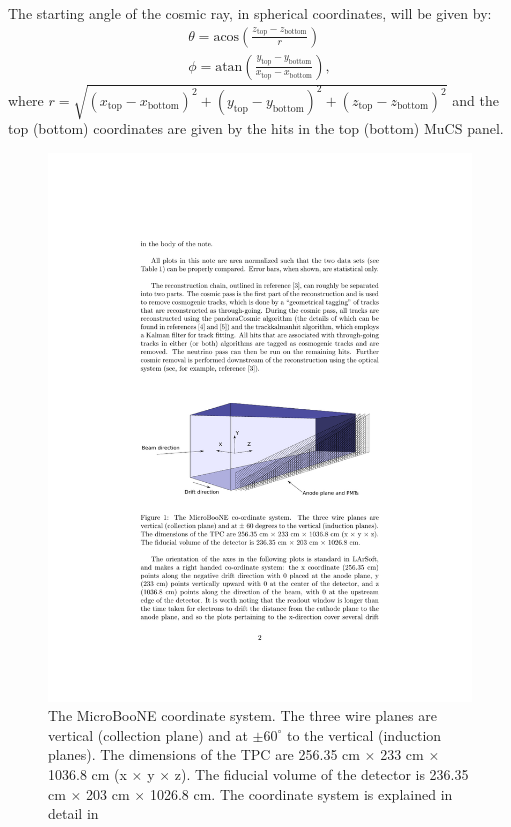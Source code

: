 \documentclass[a4paper]{scrartcl}
\begin{document}
The starting angle of the cosmic ray, in spherical coordinates, will be given by:
\begin{align}
  \theta = \mathrm{acos}\left(\frac{z_{\mathrm{top}}-z_{\mathrm{bottom}}}{r}\right) \\
  \phi = \mathrm{atan}\left(\frac{y_{\mathrm{top}}-y_{\mathrm{bottom}}}{x_{\mathrm{top}}-x_{\mathrm{bottom}}}\right),
\end{align}
where $r = \sqrt{(x_{\mathrm{top}}-x_{\mathrm{bottom}})^2+(y_{\mathrm{top}}-y_{\mathrm{bottom}})^2+(z_{\mathrm{top}}-z_{\mathrm{bottom}})^2}$ and the top (bottom) coordinates are given by the hits in the top (bottom) MuCS panel.
\begin{figure}[htbp]
  \begin{center}
    \includegraphics[width=0.8\linewidth]{figures/coord.pdf}

    \caption{The MicroBooNE coordinate system. The three wire planes are vertical (collection plane) and at  $\pm60^{\circ}$ to the vertical (induction planes). The dimensions of the TPC are 256.35 cm $\times$ 233 cm $\times$ 1036.8 cm (x $\times$ y $\times$ z). The fiducial volume of the detector is 236.35 cm $\times$ 203 cm $\times$ 1026.8 cm. The coordinate system is explained in detail in \cite{mcdata}} \label{fig:coord}
  \end{center}
\end{figure}
\end{document}
